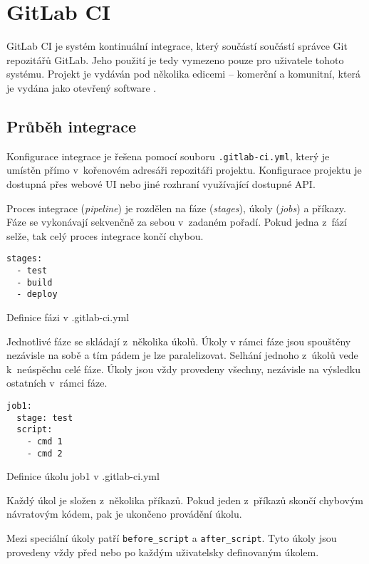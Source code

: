 \chapter{GitLab CI}

GitLab CI je systém kontinuální integrace, který součástí součástí správce Git repozitářů GitLab.
Jeho použití je tedy vymezeno pouze pro uživatele tohoto systému.
Projekt je vydáván pod několika edicemi -- komerční a komunitní, která je vydána jako otevřený software \cite{gitlab_ce}.

\section{Průběh integrace}

Konfigurace integrace je řešena pomocí souboru \verb|.gitlab-ci.yml|, který je umístěn přímo v~kořenovém adresáři repozitáři projektu.
Konfigurace projektu je dostupná přes webové UI nebo jiné rozhraní využívající dostupné API.

Proces integrace (\textit{pipeline}) je rozdělen na fáze (\textit{stages}), úkoly (\textit{jobs}) a příkazy.
Fáze se vykonávají sekvenčně za sebou v~zadaném pořadí.
Pokud jedna z~fází selže, tak celý proces integrace končí chybou.

\begin{listing}[ht]
\begin{verbatim}
stages:
  - test
  - build
  - deploy
\end{verbatim}
\caption{Definice fázi v .gitlab-ci.yml}
\end{listing}

Jednotlivé fáze se skládají z~několika úkolů.
Úkoly v rámci fáze jsou spouštěny nezávisle na sobě a tím pádem je lze paralelizovat.
Selhání jednoho z~úkolů vede k~neúspěchu celé fáze.
Úkoly jsou vždy provedeny všechny, nezávisle na výsledku ostatních v~rámci fáze.

\begin{listing}[ht]
\begin{verbatim}
job1:
  stage: test
  script:
    - cmd 1
    - cmd 2
\end{verbatim}
\caption{Definice úkolu job1 v .gitlab-ci.yml}
\end{listing}

Každý úkol je složen z~několika příkazů.
Pokud jeden z~příkazů skončí chybovým návratovým kódem, pak je ukončeno provádění úkolu.

Mezi speciální úkoly patří \verb|before_script| a \verb|after_script|.
Tyto úkoly jsou provedeny vždy před nebo po každým uživatelsky definovaným úkolem.

